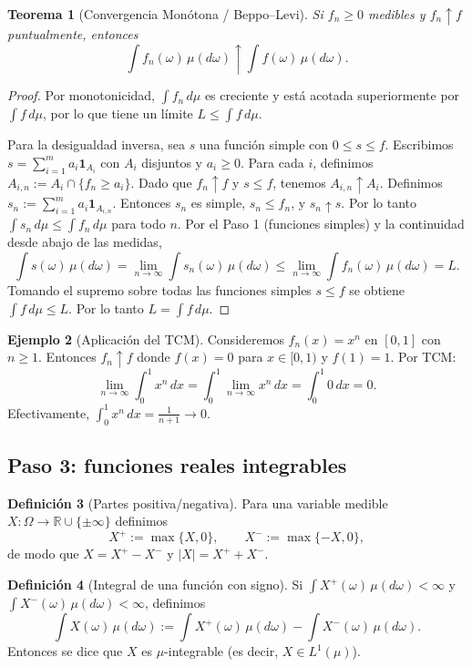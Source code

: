 \documentclass[11pt,a4paper]{article}
\theoremstyle{plain}
\newtheorem{theorem}{Teorema}[section]
\theoremstyle{definition}
\newtheorem{definition}[theorem]{Definición}
\newtheorem{example}[theorem]{Ejemplo}
\theoremstyle{remark}
\newcommand{\1}{\mathbf{1}}
\newcommand{\RR}{\mathbb{R}}
\newcommand{\abs}[1]{\left\lvert #1\right\rvert}
\begin{document}
\begin{theorem}[Convergencia Monótona / Beppo--Levi]
\label{thm:MCT}
Si $f_n\ge0$ medibles y $f_n\uparrow f$ puntualmente, entonces
\[
\int f_n(\omega)\,\mu(d\omega) \uparrow \int f(\omega)\,\mu(d\omega).
\]
\end{theorem}

\begin{proof}
Por monotonicidad, $\int f_n\,d\mu$ es creciente y está acotada superiormente por $\int f\,d\mu$, por lo que tiene un límite $L\le \int f\,d\mu$.

Para la desigualdad inversa, sea $s$ una función simple con $0\le s\le f$. Escribimos $s=\sum_{i=1}^m a_i \1_{A_i}$ con $A_i$ disjuntos y $a_i\ge0$.
Para cada $i$, definimos $A_{i,n}:=A_i\cap\{f_n\ge a_i\}$. Dado que $f_n\uparrow f$ y $s\le f$, tenemos $A_{i,n}\uparrow A_i$.
Definimos $s_n:=\sum_{i=1}^m a_i\1_{A_{i,n}}$. Entonces $s_n$ es simple, $s_n\le f_n$, y $s_n\uparrow s$.
Por lo tanto $\int s_n\,d\mu\le \int f_n\,d\mu$ para todo $n$. Por el Paso 1 (funciones simples) y la continuidad desde abajo de las medidas,
\[
\int s(\omega)\,\mu(d\omega) = \lim_{n\to\infty}\int s_n(\omega)\,\mu(d\omega) \le \lim_{n\to\infty}\int f_n(\omega)\,\mu(d\omega) = L.
\]
Tomando el supremo sobre todas las funciones simples $s\le f$ se obtiene $\int f\,d\mu\le L$. Por lo tanto $L=\int f\,d\mu$.
\end{proof}

\begin{example}[Aplicación del TCM]
Consideremos $f_n(x)=x^n$ en $[0,1]$ con $n\ge1$. Entonces $f_n\uparrow f$ donde $f(x)=0$ para $x\in[0,1)$ y $f(1)=1$. Por TCM:
\[
\lim_{n\to\infty}\int_0^1 x^n\,dx = \int_0^1 \lim_{n\to\infty} x^n\,dx = \int_0^1 0\,dx = 0.
\]
Efectivamente, $\int_0^1 x^n\,dx = \frac{1}{n+1}\to 0$.
\end{example}

\subsection{Paso 3: funciones reales integrables}

\begin{definition}[Partes positiva/negativa]
Para una variable medible $X:\Omega\to\RR\cup\{\pm\infty\}$ definimos
\[
X^+ := \max\{X,0\},\qquad X^-:=\max\{-X,0\},
\]
de modo que $X=X^+-X^-$ y $\abs{X}=X^++X^-$.
\end{definition}

\begin{definition}[Integral de una función con signo]
Si $\int X^+(\omega)\,\mu(d\omega)<\infty$ y $\int X^-(\omega)\,\mu(d\omega)<\infty$, definimos
\[
\int X(\omega)\,\mu(d\omega) := \int X^+(\omega)\,\mu(d\omega) - \int X^-(\omega)\,\mu(d\omega).
\]
Entonces se dice que $X$ es $\mu$-integrable (es decir, $X\in L^1(\mu)$).
\end{definition}
\end{document}
